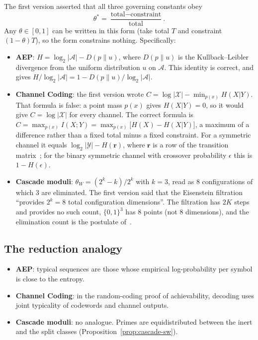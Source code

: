 \documentclass[12pt]{amsart}
\theoremstyle{plain}
\theoremstyle{definition}
\theoremstyle{remark}
\newcommand{\thetaW}{\theta_W}
\begin{document}
The first version asserted that all three governing constants obey
\[
  \theta^* = \frac{\text{total} - \text{constraint}}{\text{total}}.
\]
Any $\theta \in [0,1]$ can be written in this form (take total $T$ and
constraint $(1-\theta)T$), so the form constrains nothing. Specifically:
\begin{itemize}
  \item \textbf{AEP}: $H = \log_2|\mathcal{A}| - D(p \| u)$, where $D(p\|u)$ is
    the Kullback--Leibler divergence from the uniform distribution $u$ on
    $\mathcal{A}$. This identity is correct, and gives
    $H/\log_2|\mathcal{A}| = 1 - D(p\|u)/\log_2|\mathcal{A}|$.

  \item \textbf{Channel Coding}: the first version wrote
    $C = \log|\mathcal{X}| - \min_{p(x)} H(X|Y)$. That formula is false: a point
    mass $p(x)$ gives $H(X|Y) = 0$, so it would give $C = \log|\mathcal{X}|$ for
    every channel. The correct formula is
    $C = \max_{p(x)} I(X;Y) = \max_{p(x)}\bigl[H(X) - H(X|Y)\bigr]$, a maximum of
    a difference rather than a fixed total minus a fixed constraint. For a
    symmetric channel it equals $\log_2|\mathcal{Y}| - H(\mathbf{r})$, where
    $\mathbf{r}$ is a row of the transition matrix~\cite[Ch.~7]{CoverThomas2006};
    for the binary symmetric channel with crossover probability $\epsilon$ this
    is $1 - H(\epsilon)$.

  \item \textbf{Cascade moduli}: $\thetaW = (2^k - k)/2^k$ with $k = 3$, read as
    $8$ configurations of which $3$ are eliminated. The first version said that
    the Eisenstein filtration ``provides $2^k = 8$ total configuration
    dimensions''. The filtration has $2K$ steps and provides no such count,
    $\{0,1\}^3$ has $8$ points (not $8$ dimensions), and the elimination count is
    the postulate of~\cite{WakilCF,WakilRamanujan}.
\end{itemize}

\subsection{The reduction analogy}

\begin{itemize}
  \item \textbf{AEP}: typical sequences are those whose empirical
    log-probability per symbol is close to the entropy.
  \item \textbf{Channel Coding}: in the random-coding proof of achievability,
    decoding uses joint typicality of codewords and channel outputs.
  \item \textbf{Cascade moduli}: no analogue. Primes are equidistributed between
    the inert and the split classes (Proposition~\ref{prop:cascade-sw}).
\end{itemize}
\end{document}
